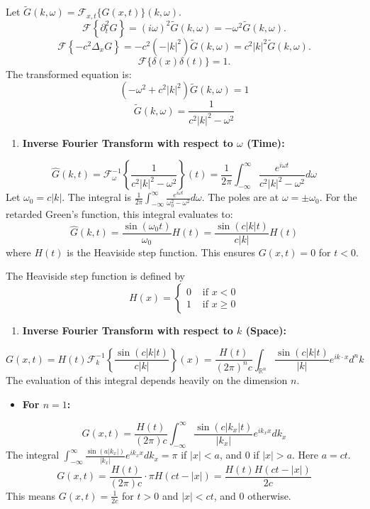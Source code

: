 Let $\widetilde{G}(k, \omega)=\mathcal{F}_{x, t}\{G(x, t)\}(k, \omega)$.
\[
\mathcal{F}\left\{\partial_t^2 G\right\}=(i \omega)^2 \widetilde{G}(k, \omega)=-\omega^2 \widetilde{G}(k, \omega).
\]
\[
\mathcal{F}\left\{-c^2 \Delta_x G\right\}=-c^2\left(-|k|^2\right) \widetilde{G}(k, \omega)=c^2|k|^2 \widetilde{G}(k, \omega).
\]
\[
\mathcal{F}\{\delta(x) \delta(t)\}=1.
\]
The transformed equation is:
\[
\left(-\omega^2+c^2|k|^2\right) \widetilde{G}(k, \omega)=1
\]
\[
\widetilde{G}(k, \omega)=\frac{1}{c^2|k|^2-\omega^2}
\]
\begin{enumerate}
	\item \textbf{Inverse Fourier Transform with respect to $\omega$ (Time):}
\end{enumerate}
\[
\widehat{G}(k, t)=\mathcal{F}_\omega^{-1}\left\{\frac{1}{c^2|k|^2-\omega^2}\right\}(t)=\frac{1}{2 \pi} \int_{-\infty}^\infty \frac{e^{i \omega t}}{c^2|k|^2-\omega^2} d \omega
\]
Let $\omega_0=c|k|$. The integral is $\frac{1}{2 \pi} \int_{-\infty}^\infty \frac{e^{i \omega t}}{\omega_0^2-\omega^2} d \omega$.
The poles are at $\omega=\pm \omega_0$. For the retarded Green's function, this integral evaluates to:
\[
\widehat{G}(k, t)=\frac{\sin \left(\omega_0 t\right)}{\omega_0} H(t)=\frac{\sin (c|k| t)}{c|k|} H(t)
\]
where $H(t)$ is the Heaviside step function. This ensures $G(x, t)=0$ for $t<0$.

\begin{definition}
The Heaviside step function is defined by
\[
H(x)= \begin{cases}0 & \text { if } x<0 \\ 1 & \text { if } x \geq 0\end{cases}
\]
\end{definition}
\begin{enumerate}
	\item \textbf{Inverse Fourier Transform with respect to $k$ (Space):}
\end{enumerate}
\[
G(x, t)=H(t) \mathcal{F}_k^{-1}\left\{\frac{\sin (c|k| t)}{c|k|}\right\}(x)=\frac{H(t)}{(2 \pi)^n c} \int_{\mathbb{R}^n} \frac{\sin (c|k| t)}{|k|} e^{i k \cdot x} d^n k
\]
The evaluation of this integral depends heavily on the dimension $n$.

\begin{itemize}
	\item \textbf{For $n=1$:}
\end{itemize}
\[
G(x, t)=\frac{H(t)}{(2 \pi) c} \int_{-\infty}^\infty \frac{\sin \left(c\left|k_x\right| t\right)}{\left|k_x\right|} e^{i k_x x} d k_x
\]
The integral $\int_{-\infty}^\infty \frac{\sin \left(a\left|k_x\right|\right)}{\left|k_x\right|} e^{i k_x x} d k_x=\pi$ if $|x|<a$, and $0$ if $|x|>a$. Here $a=c t$.
\[
G(x, t)=\frac{H(t)}{(2 \pi) c} \cdot \pi H(c t-|x|)=\frac{H(t) H(c t-|x|)}{2 c}
\]
This means $G(x, t)=\frac{1}{2 c}$ for $t>0$ and $|x|<c t$, and $0$ otherwise.

